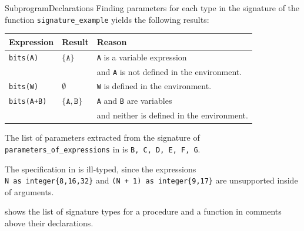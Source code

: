 \begin{TypingRuleList}{SubprogramDeclarations}
Finding parameters for each type in the signature of the function \texttt{signature\_example}
yields the following results:
\begin{center}
\begin{tabular}{lll}
\textbf{Expression} & \textbf{Result} & \textbf{Reason}\\
\hline
\texttt{bits(A)} & $\{\texttt{A}\}$ & \texttt{A} is a variable expression \\
& & and \texttt{A} is not defined in the environment.\\
\texttt{bits(W)} & $\emptyset$ & \texttt{W} is defined in the environment.\\
\texttt{bits(A+B)} & $\{\texttt{A}, \texttt{B}\}$ & \texttt{A} and \texttt{B} are variables \\
& & and neither is defined in the environment.\\
\end{tabular}
\end{center}

The list of parameters extracted from the signature of \verb|parameters_of_expressions|
in  is
\verb|B, C, D, E, F, G|.

The specification in  is ill-typed, since the
expressions \\
\verb|N as integer{8,16,32}| and \verb|(N + 1) as integer{9,17}|
are unsupported inside\\ \bitvectortypesterm{} of arguments.




 shows the list of signature types for a procedure and a function
in comments above their declarations.





\end{TypingRuleList}
